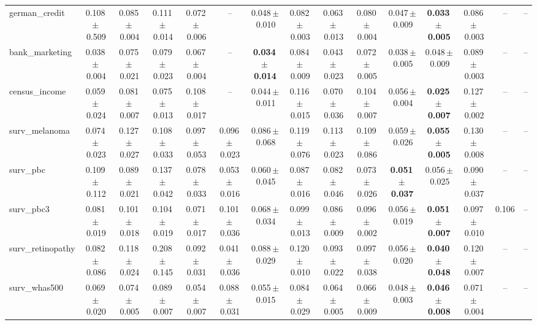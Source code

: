 \documentclass[8pt]{extarticle}
\begin{document}
\begin{longtable}{l*{14}{c}}
german\_credit & 0.108\,$\pm$\,0.509 & 0.085\,$\pm$\,0.004 & 0.111\,$\pm$\,0.014 & 0.072\,$\pm$\,0.006 & -- & 0.048\,$\pm$\,0.010 & 0.082\,$\pm$\,0.003 & 0.063\,$\pm$\,0.013 & 0.080\,$\pm$\,0.004 & 0.047\,$\pm$\,0.009 & \textbf{0.033\,$\pm$\,0.005} & 0.086\,$\pm$\,0.003 & -- & -- \\
bank\_marketing & 0.038\,$\pm$\,0.004 & 0.075\,$\pm$\,0.021 & 0.079\,$\pm$\,0.023 & 0.067\,$\pm$\,0.004 & -- & \textbf{0.034\,$\pm$\,0.014} & 0.084\,$\pm$\,0.009 & 0.043\,$\pm$\,0.023 & 0.072\,$\pm$\,0.005 & 0.038\,$\pm$\,0.005 & 0.048\,$\pm$\,0.009 & 0.089\,$\pm$\,0.003 & -- & -- \\
census\_income & 0.059\,$\pm$\,0.024 & 0.081\,$\pm$\,0.007 & 0.075\,$\pm$\,0.013 & 0.108\,$\pm$\,0.017 & -- & 0.044\,$\pm$\,0.011 & 0.116\,$\pm$\,0.015 & 0.070\,$\pm$\,0.036 & 0.104\,$\pm$\,0.007 & 0.056\,$\pm$\,0.004 & \textbf{0.025\,$\pm$\,0.007} & 0.127\,$\pm$\,0.002 & -- & -- \\
surv\_melanoma & 0.074\,$\pm$\,0.023 & 0.127\,$\pm$\,0.027 & 0.108\,$\pm$\,0.033 & 0.097\,$\pm$\,0.053 & 0.096\,$\pm$\,0.023 & 0.086\,$\pm$\,0.068 & 0.119\,$\pm$\,0.076 & 0.113\,$\pm$\,0.023 & 0.109\,$\pm$\,0.086 & 0.059\,$\pm$\,0.026 & \textbf{0.055\,$\pm$\,0.005} & 0.130\,$\pm$\,0.008 & -- & -- \\
surv\_pbc & 0.109\,$\pm$\,0.112 & 0.089\,$\pm$\,0.021 & 0.137\,$\pm$\,0.042 & 0.078\,$\pm$\,0.033 & 0.053\,$\pm$\,0.016 & 0.060\,$\pm$\,0.045 & 0.087\,$\pm$\,0.016 & 0.082\,$\pm$\,0.046 & 0.073\,$\pm$\,0.026 & \textbf{0.051\,$\pm$\,0.037} & 0.056\,$\pm$\,0.025 & 0.090\,$\pm$\,0.037 & -- & -- \\
surv\_pbc3 & 0.081\,$\pm$\,0.019 & 0.101\,$\pm$\,0.018 & 0.104\,$\pm$\,0.019 & 0.071\,$\pm$\,0.017 & 0.101\,$\pm$\,0.036 & 0.068\,$\pm$\,0.034 & 0.099\,$\pm$\,0.013 & 0.086\,$\pm$\,0.009 & 0.096\,$\pm$\,0.002 & 0.056\,$\pm$\,0.019 & \textbf{0.051\,$\pm$\,0.007} & 0.097\,$\pm$\,0.010 & 0.106 & -- \\
surv\_retinopathy & 0.082\,$\pm$\,0.086 & 0.118\,$\pm$\,0.024 & 0.208\,$\pm$\,0.145 & 0.092\,$\pm$\,0.031 & 0.041\,$\pm$\,0.036 & 0.088\,$\pm$\,0.029 & 0.120\,$\pm$\,0.010 & 0.093\,$\pm$\,0.022 & 0.097\,$\pm$\,0.038 & 0.056\,$\pm$\,0.020 & \textbf{0.040\,$\pm$\,0.048} & 0.120\,$\pm$\,0.007 & -- & -- \\
surv\_whas500 & 0.069\,$\pm$\,0.020 & 0.074\,$\pm$\,0.005 & 0.089\,$\pm$\,0.007 & 0.054\,$\pm$\,0.007 & 0.088\,$\pm$\,0.031 & 0.055\,$\pm$\,0.015 & 0.084\,$\pm$\,0.029 & 0.064\,$\pm$\,0.005 & 0.066\,$\pm$\,0.009 & 0.048\,$\pm$\,0.003 & \textbf{0.046\,$\pm$\,0.008} & 0.071\,$\pm$\,0.004 & -- & -- \\

\end{longtable}
\end{document}
